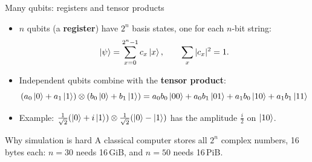 \documentclass[aspectratio=169,11pt]{beamer}
\newcommand{\key}[1]{{\color{qdark}\textbf{#1}}}
\begin{document}
\begin{frame}{Many qubits: registers and tensor products}
  \begin{itemize}
    \item $n$ qubits (a \key{register}) have $2^n$ basis states, one for each $n$-bit string:
      \[ \ket{\psi} = \sum_{x=0}^{2^n-1} c_x \ket{x}, \qquad \sum_x |c_x|^2 = 1 . \]
    \item Independent qubits combine with the \key{tensor product}:
      \[ (a_0\ket0 + a_1\ket1)\otimes(b_0\ket0 + b_1\ket1) = a_0b_0\ket{00} + a_0b_1\ket{01} + a_1b_0\ket{10} + a_1b_1\ket{11} \]
    \item Example: $\frac{1}{\sqrt2}(\ket0 + i\ket1)\otimes\frac{1}{\sqrt2}(\ket0 - \ket1)$ has the amplitude $\frac i2$ on $\ket{10}$.
  \end{itemize}
  \begin{alertblock}{Why simulation is hard}
    A classical computer stores all $2^n$ complex numbers, 16 bytes each: $n = 30$ needs 16\,GiB, and $n = 50$ needs 16\,PiB.
  \end{alertblock}
\end{frame}
\end{document}
